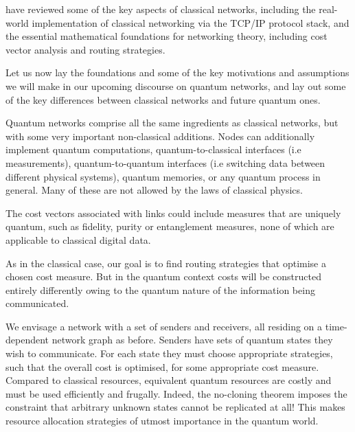 %
%

\newline

 have reviewed some of the key aspects of classical networks, including the real-world implementation of classical networking via the TCP/IP protocol stack, and the essential mathematical foundations for networking theory, including cost vector analysis and routing strategies.

Let us now lay the foundations and some of the key motivations and assumptions we will make in our upcoming discourse on quantum networks, and lay out some of the key differences between classical networks and future quantum ones.

Quantum networks comprise all the same ingredients as classical networks, but with some very important non-classical additions. Nodes can additionally implement quantum computations, quantum-to-classical interfaces (i.e measurements), quantum-to-quantum interfaces (i.e switching data between different physical systems), quantum memories, or any quantum process in general. Many of these are not allowed by the laws of classical physics.

The cost vectors associated with links could include measures that are uniquely quantum, such as fidelity, purity or entanglement measures, none of which are applicable to classical digital data.

As in the classical case, our goal is to find routing strategies that optimise a chosen cost measure. But in the quantum context costs will be constructed entirely differently owing to the quantum nature of the information being communicated.

We envisage a network with a set of senders and receivers, all residing on a time-dependent network graph as before. Senders have sets of quantum states they wish to communicate. For each state they must choose appropriate strategies, such that the overall cost is optimised, for some appropriate cost measure. Compared to classical resources, equivalent quantum resources are costly and must be used efficiently and frugally. Indeed, the no-cloning theorem imposes the constraint that arbitrary unknown states cannot be replicated at all! This makes resource allocation strategies of utmost importance in the quantum world.


